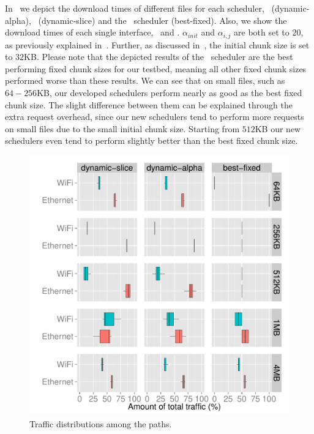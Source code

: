 In~ we depict the download times of different files for each scheduler, \ie \algalpha~(dynamic-alpha), \algslice~(dynamic-slice) and the \algbase~scheduler (best-fixed). 
Also, we show the download times of each single interface, \ie \ethernet~and \wifi.
$\alpha_{init}$ and $\alpha_{i,j}$ are both set to $20$, as previously explained in~. 
Further, as discussed in~, the initial chunk size is set to $32$KB.
Please note that the depicted results of the \algbase~scheduler are the best performing fixed chunk sizes for our testbed, meaning all other fixed chunk sizes performed worse than these results. 
We can see that on small files, such as $64-256$KB, our developed schedulers perform nearly as good as the best fixed chunk size. 
The slight difference between them can be explained through the extra request overhead, since our new schedulers tend to perform more requests on small files due to the small initial chunk size. 
Starting from $512$KB our new schedulers even tend to perform slightly better than the best fixed chunk size. 


\begin{figure}[!htb]
    \begin{minipage}[t]{0.8\linewidth}
    \begin{center}
        \includegraphics[width=\linewidth]{Figures/traffic-distribution-all.pdf}
		\caption{\label{fig:evaluation-comparison-traffic}Traffic distributions among the paths.}
    \end{center}
    \end{minipage}
  \vspace*{-0.3cm}
\end{figure}

